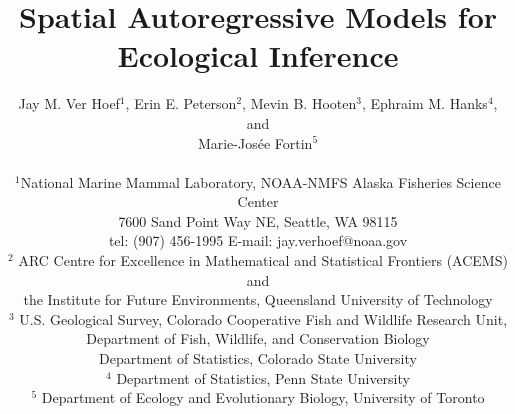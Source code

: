 \documentclass[11pt, titlepage]{article}\usepackage[]{graphicx}\usepackage[]{color}
\begin{document}

\titlepage
\title {Spatial Autoregressive Models for Ecological Inference}
\author{Jay M. Ver Hoef$^1$, Erin E. Peterson$^2$, Mevin B. Hooten$^3$, Ephraim M. Hanks$^4$, and \\
	Marie-Jos\'{e}e Fortin$^5$ \\
\hrulefill \\ 
$^1$National Marine Mammal Laboratory, NOAA-NMFS Alaska Fisheries Science Center\\
7600 Sand Point Way NE, Seattle, WA 98115\\
tel: (907) 456-1995 \hspace{.5cm} E-mail: jay.verhoef@noaa.gov\\
$^2$ ARC Centre for Excellence in Mathematical and Statistical Frontiers (ACEMS) and \\
the Institute for Future Environments, Queensland University of Technology \\ 
$^3$ U.S. Geological Survey, Colorado Cooperative Fish and Wildlife Research Unit, \\
Department of Fish, Wildlife, and Conservation Biology \\
Department of Statistics, Colorado State University \\
$^4$ Department of Statistics, Penn State University \\
$^5$ Department of Ecology and Evolutionary Biology, University of Toronto \\
\hrulefill \\
}

\maketitle

\end{document}
